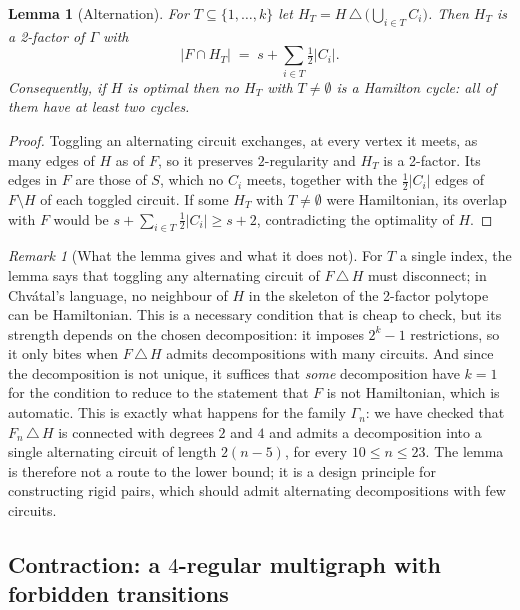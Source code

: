 \documentclass[11pt,a4paper]{article}
\newtheorem{lemma}[theorem]{Lemma}
\theoremstyle{definition}
\theoremstyle{remark}
\newtheorem{remark}[theorem]{Remark}
\begin{document}
\begin{lemma}[Alternation]\label{lem:alternation}
For $T\subseteq\{1,\dots,k\}$ let $H_T=H\,\triangle\,\bigl(\bigcup_{i\in T}C_i\bigr)$. Then $H_T$ is a 2-factor of $\Gamma$ with
\[
|F\cap H_T|\;=\;s+\sum_{i\in T}\tfrac12|C_i| .
\]
Consequently, if $H$ is optimal then no $H_T$ with $T\ne\emptyset$ is a Hamilton cycle: all of them have at least two cycles.
\end{lemma}

\begin{proof}
Toggling an alternating circuit exchanges, at every vertex it meets, as many edges of $H$ as of $F$, so it preserves $2$-regularity and $H_T$ is a 2-factor. Its edges in $F$ are those of $S$, which no $C_i$ meets, together with the $\tfrac12|C_i|$ edges of $F\setminus H$ of each toggled circuit. If some $H_T$ with $T\ne\emptyset$ were Hamiltonian, its overlap with $F$ would be $s+\sum_{i\in T}\tfrac12|C_i|\ge s+2$, contradicting the optimality of $H$.
\end{proof}

\begin{remark}[What the lemma gives and what it does not]\label{rem:alternation}
For $T$ a single index, the lemma says that toggling any alternating circuit of $F\,\triangle\,H$ must disconnect; in Chvátal's language, no neighbour of $H$ in the skeleton of the 2-factor polytope can be Hamiltonian. This is a necessary condition that is cheap to check, but its strength depends on the chosen decomposition: it imposes $2^k-1$ restrictions, so it only bites when $F\,\triangle\,H$ admits decompositions with many circuits. And since the decomposition is not unique, it suffices that \emph{some} decomposition have $k=1$ for the condition to reduce to the statement that $F$ is not Hamiltonian, which is automatic. This is exactly what happens for the family $\Gamma_n$: we have checked that $F_n\,\triangle\,H$ is connected with degrees $2$ and $4$ and admits a decomposition into a single alternating circuit of length $2(n-5)$, for every $10\le n\le23$. The lemma is therefore not a route to the lower bound; it is a design principle for constructing rigid pairs, which should admit alternating decompositions with few circuits.
\end{remark}

\subsection{Contraction: a \texorpdfstring{$4$}{4}-regular multigraph with forbidden transitions}
\end{document}

